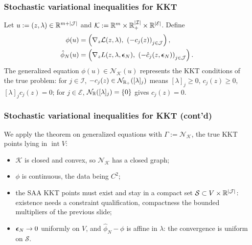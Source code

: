 \documentclass[aspectratio=169]{beamer}
\begin{document}
\begin{frame}
\frametitle{Stochastic variational inequalities for KKT}

Let $u := (z,\lambda) \in \mathbb{R}^{m+|\mathcal{J}|}$ and $\mathcal{K} := \mathbb{R}^m
\times \mathbb{R}^{|\mathcal{I}|}_+ \times \mathbb{R}^{|\mathcal{E}|}$.
Define
\begin{align*}
	\phi(u) &= \left( \nabla_z \mathcal{L}(z, \lambda),\ \left( -c_j(z) \right)_{j \in \mathcal{J}} \right),\\
	\hat{\phi}_N(u) &= \left( \nabla_z L(z, \lambda, \bsepsilon_N),\ \left( -\hat{c}_j(z, \bsepsilon_N) \right)_{j \in \mathcal{J}} \right).
\end{align*}
The generalized equation $\phi(u) \in \mathcal{N}_{\mathcal{K}}(u)$ represents the KKT conditions of the true problem: for $j \in \mathcal{I}$, $-c_j(z) \in \mathcal{N}_{\mathbb{R}_+}([\lambda]_j)$ means $[\lambda]_j \geq 0$, $c_j(z) \geq 0$, $[\lambda]_j c_j(z) = 0$; for $j \in \mathcal{E}$, $\mathcal{N}_{\mathbb{R}}([\lambda]_j) = \{0\}$ gives $c_j(z) = 0$.

\end{frame}

\begin{frame}
\frametitle{Stochastic variational inequalities for KKT (cont'd)}

We apply the theorem on generalized equations with $\Gamma := \mathcal{N}_{\mathcal{K}}$, the true KKT points lying in $\operatorname{int} V$:
\begin{itemize}
\item[(a)] $\mathcal{K}$ is closed and convex, so $\mathcal{N}_{\mathcal{K}}$ has a closed graph;
\item[(b)] $\phi$ is continuous, the data being $C^2$;
\item[(c)] the SAA KKT points must exist and stay in a compact set $\mathcal{S} \subset V \times \mathbb{R}^{|\mathcal{J}|}$: existence needs a constraint qualification, compactness the bounded multipliers of the previous slide;
\item[(d)] ${\boldsymbol{\epsilon}}_N \rightarrow 0$ uniformly on $V$, and $\hat{\phi}_N - \phi$ is affine in $\lambda$: the convergence is uniform on $\mathcal{S}$.
\end{itemize}



\end{frame}
\end{document}
